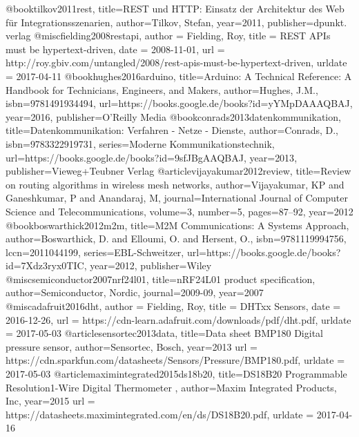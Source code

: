 @book{tilkov2011rest,
	title={REST und HTTP: Einsatz der Architektur des Web f{\"u}r Integrationsszenarien},
	author={Tilkov, Stefan},
	year={2011},
	publisher={dpunkt. verlag}
}
@misc{fielding2008restapi,
	author = {Fielding, Roy},
	title = {REST APIs must be hypertext-driven},
	date = {2008-11-01},
	url = {http://roy.gbiv.com/untangled/2008/rest-apis-must-be-hypertext-driven},
	urldate = {2017-04-11}
}
@book{hughes2016arduino,
	title={Arduino: A Technical Reference: A Handbook for Technicians, Engineers, and Makers},
	author={Hughes, J.M.},
	isbn={9781491934494},
	url={https://books.google.de/books?id=yYMpDAAAQBAJ},
	year={2016},
	publisher={O'Reilly Media}
}
@book{conrads2013datenkommunikation,
	title={Datenkommunikation: Verfahren - Netze - Dienste},
	author={Conrads, D.},
	isbn={9783322919731},
	series={Moderne Kommunikationstechnik},
	url={https://books.google.de/books?id=9sfJBgAAQBAJ},
	year={2013},
	publisher={Vieweg+Teubner Verlag}
}
@article{vijayakumar2012review,
	title={Review on routing algorithms in wireless mesh networks},
	author={Vijayakumar, KP and Ganeshkumar, P and Anandaraj, M},
	journal={International Journal of Computer Science and Telecommunications},
	volume={3},
	number={5},
	pages={87--92},
	year={2012}
}
@book{boswarthick2012m2m,
	title={M2M Communications: A Systems Approach},
	author={Boswarthick, D. and Elloumi, O. and Hersent, O.},
	isbn={9781119994756},
	lccn={2011044199},
	series={EBL-Schweitzer},
	url={https://books.google.de/books?id=7Xdz3ryx0TIC},
	year={2012},
	publisher={Wiley}
}
@misc{semiconductor2007nrf24l01,
	title={nRF24L01 product specification},
	author={Semiconductor, Nordic},
	journal={2009-09},
	year={2007}
}
@misc{adafruit2016dht,
	author = {Fielding, Roy},
	title = {DHTxx Sensors},
	date = {2016-12-26},
	url = {https://cdn-learn.adafruit.com/downloads/pdf/dht.pdf},
	urldate = {2017-05-03}
}
@article{sensortec2013data,
	title={Data sheet BMP180 Digital pressure sensor},
	author={Sensortec, Bosch},
	year={2013}
	url = {https://cdn.sparkfun.com/datasheets/Sensors/Pressure/BMP180.pdf},
	urldate = {2017-05-03}
}
@article{maximintegrated2015ds18b20,
	title={DS18B20 Programmable Resolution1-Wire Digital Thermometer },
	author={Maxim Integrated Products, Inc},
	year={2015}
	url = {https://datasheets.maximintegrated.com/en/ds/DS18B20.pdf},
	urldate = {2017-04-16}
}

